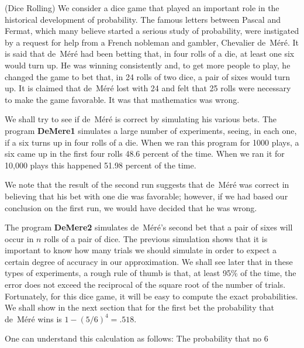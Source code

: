 \begin{example}(Dice Rolling)\label{exam 1.2}
We consider a dice game that played an important role in the
historical development of probability.  The famous letters
between Pascal and Fermat, 
which many believe started a serious study of
probability, were instigated by a request for help from a French nobleman and
gambler, Chevalier de~M\'er\'e.  
It is said that de~M\'er\'e had been betting
that, in four rolls of a die, at least one six would turn up.  He was winning
consistently and, to get more people to play, he changed the game to bet
that,
in 24 rolls of two dice, a pair of sixes would turn up. It is
claimed that de~M\'er\'e lost with 24 and felt that 25 rolls were necessary
to
make the game favorable.  It was  that mathematics
was wrong.
\par
We shall try to see if de~M\'er\'e is correct by simulating his various bets. 
The program {\bf DeMere1} simulates a large number of experiments, 
seeing, in each one, if a six turns up in four rolls of a die. When we ran this program for
1000 plays, a six came up in the first four rolls 48.6 percent of the time.  When we ran
it for 10,000 plays this happened 51.98 percent of the time.
\par
We note that the result of the second run suggests that de~M\'er\'e was correct
in believing that his bet with one die was favorable; however, if we had
based our conclusion on the first run, we would have decided that he was wrong. 
\end{example}
\par
The program {\bf DeMere2} simulates de~M\'er\'e's second bet that a 
pair of sixes will occur in 
$n$ rolls of a pair of dice.  The previous simulation shows that it is important to know how
many trials we should simulate in order to expect a certain degree of accuracy in our
approximation.  We shall see later that in these types of
experiments, a rough rule of thumb is that, at least 95\% of the time, the error does not exceed the
reciprocal of the square root of the number of trials.  Fortunately, for this dice game, it will be 
easy to compute the exact probabilities.  We shall show in the next section that for the first bet
the probability that de~M\'er\'e wins is $1 - (5/6)^4 = .518$. 
\par 
One can understand this calculation as follows:  The probability that no 6
